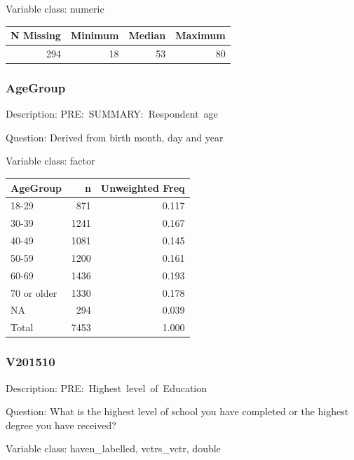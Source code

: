 \documentclass[
]{krantz}
\begin{document}
Variable class: numeric

\begin{tabular}[t]{r|r|r|r}
\hline
N Missing & Minimum & Median & Maximum\\
\hline
294 & 18 & 53 & 80\\
\hline
\end{tabular}

\hypertarget{agegroup}{%
\subsubsection*{AgeGroup}\label{agegroup}}


Description: PRE:~SUMMARY:~Respondent~age

Question: Derived from birth month, day and year

Variable class: factor

\begin{tabular}[t]{l|r|r}
\hline
AgeGroup & n & Unweighted Freq\\
\hline
18-29 & 871 & 0.117\\
\hline
30-39 & 1241 & 0.167\\
\hline
40-49 & 1081 & 0.145\\
\hline
50-59 & 1200 & 0.161\\
\hline
60-69 & 1436 & 0.193\\
\hline
70 or older & 1330 & 0.178\\
\hline
NA & 294 & 0.039\\
\hline
Total & 7453 & 1.000\\
\hline
\end{tabular}

\hypertarget{v201510}{%
\subsubsection*{V201510}\label{v201510}}


Description: PRE:~Highest~level~of~Education

Question: What is the highest level of school you have completed or the highest degree you have received?

Variable class: haven\_labelled, vctrs\_vctr, double
\end{document}
